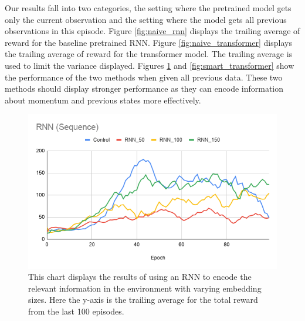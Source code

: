 \documentclass[11pt, twocolumn]{article}
\begin{document}
Our results fall into two categories, the setting where the pretrained model gets only the current observation and the setting where the model gets all previous observations in this episode. Figure \ref{fig:naive_rnn} displays the trailing average of reward for the baseline pretrained RNN. Figure \ref{fig:naive_transformer} displays the trailing average of reward for the transformer model. The trailing average is used to limit the variance displayed. Figures \ref{fig:smart_rnn} and \ref{fig:smart_transformer} show the performance of the two methods when given all previous data. These two methods should display stronger performance as they can encode information about momentum and previous states more effectively. 

\begin{figure}
\begin{center}
\includegraphics[scale=0.35]{smart_rnn.png}
\caption{This chart displays the results of using an RNN to encode the relevant information in the environment with varying embedding sizes. Here the y-axis is the trailing average for the total reward from the last 100 episodes.}
\label{fig:smart_rnn}
\end{center}
\end{figure}
\end{document}
